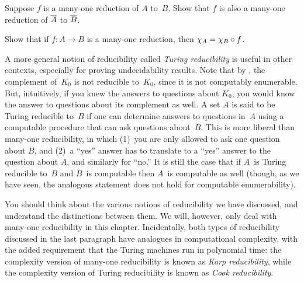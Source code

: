 \documentclass[../../../include/open-logic-section]{subfiles}
\begin{document}
\begin{prob}
Suppose $f$ is a many-one reduction of $A$ to~$B$. Show that $f$ is
also a many-one reduction of $\Complement{A}$ to $\Complement{B}$.
\end{prob}

\begin{prob}
Show that if $f\colon A \to B$ is a many-one reduction, then $\Char{A}
= \comp{f}{\Char{B}}$.
\end{prob}

\begin{digress}
A more general notion of reducibility called \emph{Turing
reducibility} is useful in other contexts, especially for proving
undecidability results. Note that by , the
complement of~$K_0$ is not reducible to~$K_0$, since it is not
computably enumerable. But, intuitively, if you knew the answers to
questions about $K_0$, you would know the answer to questions about
its complement as well. A set $A$ is said to be Turing reducible
to~$B$ if one can determine answers to questions in~$A$ using a
computable procedure that can ask questions about~$B$. This is more
liberal than many-one reducibility, in which (1)~you are only allowed
to ask one question about $B$, and (2)~a ``yes'' answer has to
translate to a ``yes'' answer to the question about $A$, and similarly
for ``no.'' It is still the case that if $A$~is Turing reducible
to~$B$ and $B$~is computable then $A$~is computable as well (though,
as we have seen, the analogous statement does not hold for computable
enumerability).

You should think about the various notions of reducibility we have
discussed, and understand the distinctions between them. We will,
however, only deal with many-one reducibility in this chapter.
Incidentally, both types of reducibility discussed in the last
paragraph have analogues in computational complexity, with the added
requirement that the Turing machines run in polynomial time: the
complexity version of many-one reducibility is known as \emph{Karp
reducibility}, while the complexity version of Turing reducibility is
known as \emph{Cook reducibility}.
\end{digress}
\end{document}
